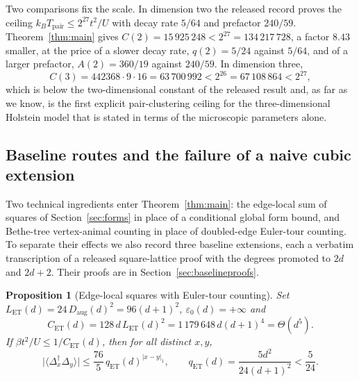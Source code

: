 \documentclass[11pt]{article}
\theoremstyle{plain}
\newtheorem{proposition}{Proposition}
\theoremstyle{definition}
\newcommand{\Daug}{D_{\mathrm{aug}}}
\newcommand{\Dop}{\Delta}
\begin{document}
Two comparisons fix the scale. In dimension two the released record
\cite{rens2d} proves the ceiling $k_BT_{\mathrm{pair}}\le 2^{27}t^2/U$ with decay
rate $5/64$ and prefactor $240/59$. Theorem~\ref{thm:main} gives
$C(2)=15\,925\,248<2^{27}=134\,217\,728$, a factor $8.43$ smaller, at the price of a
slower decay rate, $q(2)=5/24$ against $5/64$, and of a larger prefactor,
$A(2)=360/19$ against $240/59$. In dimension three,
\begin{equation}\label{eq:c3}
 C(3)=442368\cdot9\cdot16=63\,700\,992<2^{26}=67\,108\,864<2^{27},
\end{equation}
which is below the two-dimensional constant of the released result and, as far as we
know, is the first explicit pair-clustering ceiling for the three-dimensional
Holstein model that is stated in terms of the microscopic parameters alone.

\subsection{Baseline routes and the failure of a naive cubic extension}\label{sec:baselines}

Two technical ingredients enter Theorem~\ref{thm:main}: the edge-local sum of
squares of Section~\ref{sec:forms} in place of a conditional global form bound, and
Bethe-tree vertex-animal counting in place of doubled-edge Euler-tour counting. To
separate their effects we also record three baseline extensions, each a verbatim
transcription of a released square-lattice proof with the degrees promoted to
$2d$ and $2d+2$. Their proofs are in Section~\ref{sec:baselineproofs}.

\begin{proposition}[Edge-local squares with Euler-tour counting]\label{prop:a0}
Set $L_{\mathrm{ET}}(d)=24\,\Daug(d)^2=96(d+1)^2$,
$\varepsilon_0(d)=+\infty$ and
\begin{equation}\label{eq:a0constants}
 C_{\mathrm{ET}}(d)=128\,d\,L_{\mathrm{ET}}(d)^2
 =1\,179\,648\,d(d+1)^4=\Theta(d^5).
\end{equation}
If $\beta t^2/U\le1/C_{\mathrm{ET}}(d)$, then for all distinct $x,y$,
\begin{equation}\label{eq:a0bound}
 \bigl|\langle\Dop_x^\dagger\Dop_y\rangle\bigr|
 \le\frac{76}{5}\,q_{\mathrm{ET}}(d)^{|x-y|_1},
 \qquad q_{\mathrm{ET}}(d)=\frac{5d^2}{24(d+1)^2}<\frac{5}{24}.
\end{equation}
\end{proposition}
\end{document}
